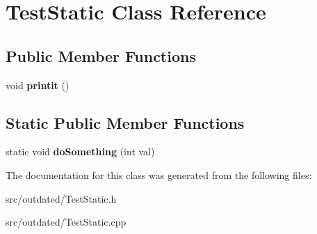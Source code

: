 \hypertarget{classTestStatic}{\section{Test\-Static Class Reference}
\label{classTestStatic}
}
\subsection*{Public Member Functions}
\begin{DoxyCompactItemize}
\item 
\hypertarget{classTestStatic_af877b62beba36ec427f5a20cf0b261e5}{void {\bfseries printit} ()}\label{classTestStatic_af877b62beba36ec427f5a20cf0b261e5}

\end{DoxyCompactItemize}
\subsection*{Static Public Member Functions}
\begin{DoxyCompactItemize}
\item 
\hypertarget{classTestStatic_af09e079b702a6fba0a9623c136665d90}{static void {\bfseries do\-Something} (int val)}\label{classTestStatic_af09e079b702a6fba0a9623c136665d90}

\end{DoxyCompactItemize}


The documentation for this class was generated from the following files\-:\begin{DoxyCompactItemize}
\item 
src/outdated/Test\-Static.\-h\item 
src/outdated/Test\-Static.\-cpp\end{DoxyCompactItemize}
